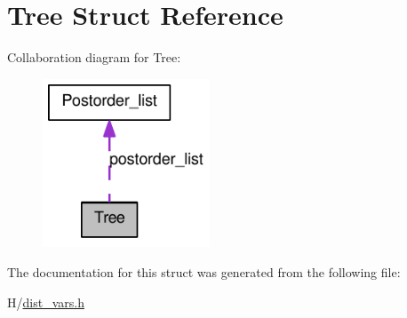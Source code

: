 \hypertarget{structTree}{
\section{Tree Struct Reference}
\label{structTree}
}


Collaboration diagram for Tree:\nopagebreak
\begin{figure}[H]
\begin{center}
\leavevmode
\includegraphics[width=141pt]{structTree__coll__graph}
\end{center}
\end{figure}


The documentation for this struct was generated from the following file:\begin{DoxyCompactItemize}
\item 
H/\hyperlink{dist__vars_8h}{dist\_\-vars.h}\end{DoxyCompactItemize}
